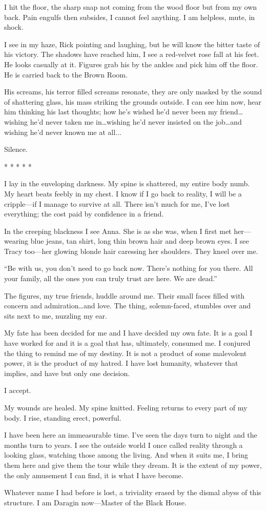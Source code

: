 \documentclass[
]{article}
\begin{document}
I hit the floor, the sharp snap not coming from the wood floor but from
my own back. Pain engulfs then subsides, I cannot feel anything. I am
helpless, mute, in shock.

I see in my haze, Rick pointing and laughing, but he will know the
bitter taste of his victory. The shadows have reached him, I see a
red-velvet rose fall at his feet. He looks casually at it. Figures grab
his by the ankles and pick him off the floor. He is carried back to the
Brown Room.

His screams, his terror filled screams resonate, they are only masked by
the sound of shattering glass, his mass striking the grounds outside. I
can see him now, hear him thinking his last thoughts; how he's wished
he'd never been my friend\ldots wishing he'd never taken me
in\ldots wishing he'd never insisted on the job\ldots and wishing he'd
never known me at all...

Silence.

* * * * *

I lay in the enveloping darkness. My spine is shattered, my entire body
numb. My heart beats feebly in my chest. I know if I go back to reality,
I will be a cripple---if I manage to survive at all. There isn't much
for me, I've lost everything; the cost paid by confidence in a friend.

In the creeping blackness I see Anna. She is as she was, when I first
met her---wearing blue jeans, tan shirt, long thin brown hair and deep
brown eyes. I see Tracy too---her glowing blonde hair caressing her
shoulders. They kneel over me.

``Be with us, you don't need to go back now. There's nothing for you
there. All your family, all the ones you can truly trust are here. We
are dead.''

The figures, my true friends, huddle around me. Their small faces filled
with concern and admiration\ldots and love. The thing, solemn-faced,
stumbles over and sits next to me, nuzzling my ear.

My fate has been decided for me and I have decided my own fate. It is a
goal I have worked for and it is a goal that has, ultimately, consumed
me. I conjured the thing to remind me of my destiny. It is not a product
of some malevolent power, it is the product of my hatred. I have lost
humanity, whatever that implies, and have but only one decision.

I accept.

My wounds are healed. My spine knitted. Feeling returns to every part of
my body. I rise, standing erect, powerful.

I have been here an immeasurable time. I've seen the days turn to night
and the months turn to years. I see the outside world I once called
reality through a looking glass, watching those among the living. And
when it suits me, I bring them here and give them the tour while they
dream. It is the extent of my power, the only amusement I can find, it
is what I have become.

Whatever name I had before is lost, a triviality erased by the dismal
abyss of this structure. I am Daragin now---Master of the Black House.
\end{document}
